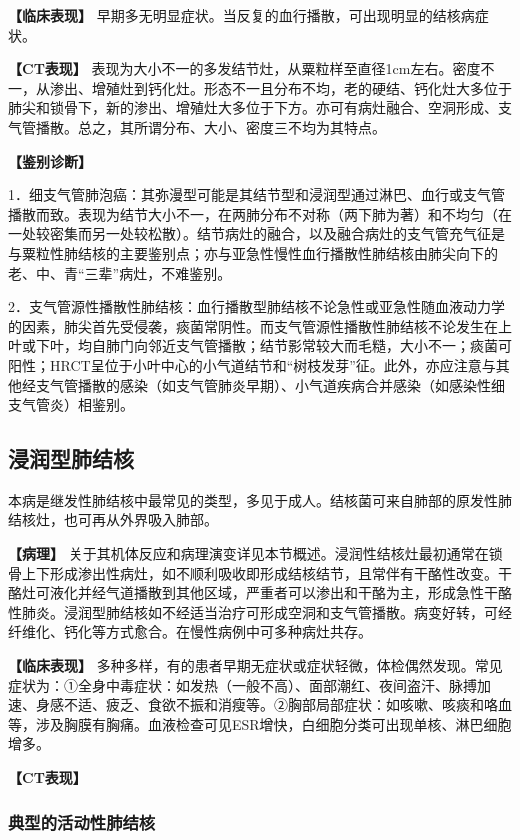 \textbf{【临床表现】}
早期多无明显症状。当反复的血行播散，可出现明显的结核病症状。

\textbf{【CT表现】}
表现为大小不一的多发结节灶，从粟粒样至直径1cm左右。密度不一，从渗出、增殖灶到钙化灶。形态不一且分布不均，老的硬结、钙化灶大多位于肺尖和锁骨下，新的渗出、增殖灶大多位于下方。亦可有病灶融合、空洞形成、支气管播散。总之，其所谓分布、大小、密度三不均为其特点。

\textbf{【鉴别诊断】}

1．细支气管肺泡癌：其弥漫型可能是其结节型和浸润型通过淋巴、血行或支气管播散而致。表现为结节大小不一，在两肺分布不对称（两下肺为著）和不均匀（在一处较密集而另一处较松散）。结节病灶的融合，以及融合病灶的支气管充气征是与粟粒性肺结核的主要鉴别点；亦与亚急性慢性血行播散性肺结核由肺尖向下的老、中、青“三辈”病灶，不难鉴别。

2．支气管源性播散性肺结核：血行播散型肺结核不论急性或亚急性随血液动力学的因素，肺尖首先受侵袭，痰菌常阴性。而支气管源性播散性肺结核不论发生在上叶或下叶，均自肺门向邻近支气管播散；结节影常较大而毛糙，大小不一；痰菌可阳性；HRCT呈位于小叶中心的小气道结节和“树枝发芽”征。此外，亦应注意与其他经支气管播散的感染（如支气管肺炎早期）、小气道疾病合并感染（如感染性细支气管炎）相鉴别。

\subsection{浸润型肺结核}

本病是继发性肺结核中最常见的类型，多见于成人。结核菌可来自肺部的原发性肺结核灶，也可再从外界吸入肺部。

\textbf{【病理】}
关于其机体反应和病理演变详见本节概述。浸润性结核灶最初通常在锁骨上下形成渗出性病灶，如不顺利吸收即形成结核结节，且常伴有干酪性改变。干酪灶可液化并经气道播散到其他区域，严重者可以渗出和干酪为主，形成急性干酪性肺炎。浸润型肺结核如不经适当治疗可形成空洞和支气管播散。病变好转，可经纤维化、钙化等方式愈合。在慢性病例中可多种病灶共存。

\textbf{【临床表现】}
多种多样，有的患者早期无症状或症状轻微，体检偶然发现。常见症状为：①全身中毒症状：如发热（一般不高）、面部潮红、夜间盗汗、脉搏加速、身感不适、疲乏、食欲不振和消瘦等。②胸部局部症状：如咳嗽、咳痰和咯血等，涉及胸膜有胸痛。血液检查可见ESR增快，白细胞分类可出现单核、淋巴细胞增多。

\textbf{【CT表现】}

\subsubsection{典型的活动性肺结核}

